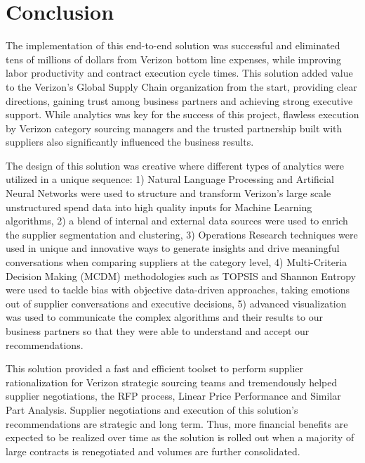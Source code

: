 \documentclass[inte,nonblindrev]{informs3} %
\begin{document}
\section{Conclusion}
The implementation of this end-to-end solution was successful and eliminated tens of millions of dollars from Verizon bottom line expenses, while improving labor productivity and contract execution cycle times. This solution added value to the Verizon's Global Supply Chain organization from the start, providing clear directions, gaining trust among business partners and achieving strong executive support. While analytics was key for the success of this project, flawless execution by Verizon category sourcing managers and the trusted partnership built with suppliers also significantly influenced the business results.

The design of this solution was creative where different types of analytics were utilized in a unique sequence: 1) Natural Language Processing and Artificial Neural Networks were used to structure and transform Verizon's large scale unstructured spend data into high quality inputs for Machine Learning algorithms, 2) a blend of internal and external data sources were used to enrich the supplier segmentation and clustering, 3) Operations Research techniques were used in unique and innovative ways to generate insights and drive meaningful conversations when comparing suppliers at the category level, 4) Multi-Criteria Decision Making (MCDM) methodologies such as TOPSIS and Shannon Entropy were used to tackle bias with objective data-driven approaches, taking emotions out of supplier conversations and executive decisions, 5) advanced visualization was used to communicate the complex algorithms and their results to our business partners so that they were able to understand and accept our recommendations.

This solution provided a fast and efficient toolset to perform supplier rationalization for Verizon strategic sourcing teams and tremendously helped supplier negotiations, the RFP process, Linear Price Performance and Similar Part Analysis. Supplier negotiations and execution of this solution's recommendations are strategic and long term. Thus, more financial benefits are expected to be realized over time as the solution is rolled out when a majority of large contracts is renegotiated and volumes are further consolidated.
\end{document}
